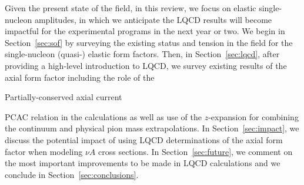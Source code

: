 Given the present state of the field, in this review, we focus on elastic single-nucleon amplitudes, in which we anticipate the LQCD results will become impactful for the experimental programs in the next year or two.
We begin in Section~\ref{sec:sof} by surveying the existing status and tension in the field for the single-nucleon (quasi-) elastic form factors.
Then, in Section~\ref{sec:lqcd}, after providing a high-level introduction to LQCD, we survey existing results of the axial form factor including the role of the%
\begin{marginnote}
  {Partially-conserved} axial current
\end{marginnote}%
PCAC relation in the calculations as well as use of the $z$-expansion for combining the continuum and physical pion mass extrapolations.
In Section~\ref{sec:impact}, we discuss the potential impact of using LQCD determinations of the axial form factor when modeling $\nu A$ cross sections.
In Section~\ref{sec:future}, we comment on the most important improvements to be made in LQCD calculations and we conclude in Section~\ref{sec:conclusions}.
